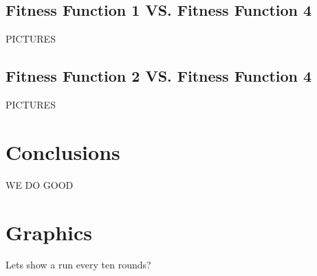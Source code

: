 \documentclass{acm_proc_article-sp}
\begin{document}
\subsection{Fitness Function 1 VS. Fitness Function 4}

PICTURES

\subsection{Fitness Function 2 VS. Fitness Function 4}

PICTURES

\section{Conclusions} %

WE DO GOOD

%

%
%



\appendix
\section{Graphics}

Lets show a run every ten rounds?

\end{document}

